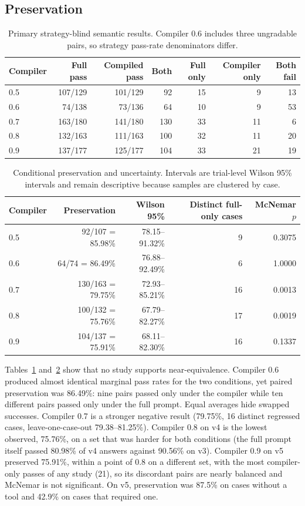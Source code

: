 \documentclass[11pt]{article}
\begin{document}
\subsection{Preservation}

\begin{table}[t]
\centering
\caption{Primary strategy-blind semantic results. Compiler 0.6 includes three ungradable pairs, so strategy pass-rate denominators differ.}
\label{tab:behavior}
\small
\begin{tabular}{lrrrrrr}
\toprule
Compiler & Full pass & Compiled pass & Both & Full only & Compiler only & Both fail \\
\midrule
0.5 & 107/129 & 101/129 & 92 & 15 & 9 & 13 \\
0.6 & 74/138 & 73/136 & 64 & 10 & 9 & 53 \\
0.7 & 163/180 & 141/180 & 130 & 33 & 11 & 6 \\
0.8 & 132/163 & 111/163 & 100 & 32 & 11 & 20 \\
0.9 & 137/177 & 125/177 & 104 & 33 & 21 & 19 \\
\bottomrule
\end{tabular}
\end{table}

\begin{table}[t]
\centering
\caption{Conditional preservation and uncertainty. Intervals are trial-level Wilson 95\% intervals and remain descriptive because samples are clustered by case.}
\label{tab:preservation}
\small
\begin{tabular}{lrrrr}
\toprule
Compiler & Preservation & Wilson 95\% & Distinct full-only cases & McNemar $p$ \\
\midrule
0.5 & 92/107 = 85.98\% & 78.15--91.32\% & 9 & 0.3075 \\
0.6 & 64/74 = 86.49\% & 76.88--92.49\% & 6 & 1.0000 \\
0.7 & 130/163 = 79.75\% & 72.93--85.21\% & 16 & 0.0013 \\
0.8 & 100/132 = 75.76\% & 67.79--82.27\% & 17 & 0.0019 \\
0.9 & 104/137 = 75.91\% & 68.11--82.30\% & 16 & 0.1337 \\
\bottomrule
\end{tabular}
\end{table}

Tables~\ref{tab:behavior} and~\ref{tab:preservation} show that no study supports near-equivalence. Compiler 0.6 produced almost identical marginal pass rates for the two conditions, yet paired preservation was 86.49\%: nine pairs passed only under the compiler while ten different pairs passed only under the full prompt. Equal averages hide swapped successes. Compiler 0.7 is a stronger negative result (79.75\%, 16 distinct regressed cases, leave-one-case-out 79.38--81.25\%). Compiler 0.8 on v4 is the lowest observed, 75.76\%, on a set that was harder for both conditions (the full prompt itself passed 80.98\% of v4 answers against 90.56\% on v3). Compiler 0.9 on v5 preserved 75.91\%, within a point of 0.8 on a different set, with the most compiler-only passes of any study (21), so its discordant pairs are nearly balanced and McNemar is not significant. On v5, preservation was 87.5\% on cases without a tool and 42.9\% on cases that required one.
\end{document}
